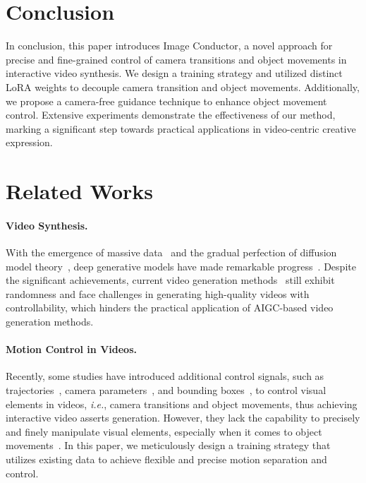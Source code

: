 \documentclass{article} %
\begin{document}
\section{Conclusion}
In conclusion, this paper introduces Image Conductor, a novel approach for precise and fine-grained control of camera transitions and object movements in interactive video synthesis. 
We  design a training strategy and utilized distinct LoRA weights to decouple camera transition and object movements. 
Additionally, we propose a camera-free guidance technique to enhance object movement control. Extensive experiments demonstrate the effectiveness of our method, marking a significant step towards practical applications in video-centric creative expression.

\newpage





\clearpage
\newpage
\appendix

\section{Related Works}
\paragraph{Video Synthesis.} With the emergence of massive data~\citep{bain2021frozen, chen2024panda} and the gradual perfection of diffusion model theory~\citep{ho2020denoising, song2020score, batzolis2021conditional}, deep generative models have made remarkable progress~\citep{ldm, TI, ControlNet, wang2023videocomposer, chen2023videocrafter1, videoworldsimulators2024}. Despite the significant achievements, current video generation methods~\citep{wang2023videocomposer, chen2023videocrafter1, videoworldsimulators2024, blattmann2023stable, girdhar2023emu} still exhibit randomness and face challenges in generating high-quality videos with controllability, which hinders the practical application of AIGC-based video generation methods.

\paragraph{Motion Control in Videos.} 
Recently, some studies have introduced additional control signals, such as trajectories~\citep{yin2023dragnuwa, wu2024draganything, wang2023motionctrl}, camera parameters~\citep{wang2023motionctrl, he2024cameractrl}, and bounding boxes~\citep{wang2024boximator}, to control visual elements in videos, \textit{i.e.}, camera transitions and object movements, thus achieving interactive video asserts generation. However, they lack the capability to precisely and finely manipulate visual elements, especially when it comes to object movements~\citep{yin2023dragnuwa, wang2023motionctrl}. In this paper, we meticulously design a training strategy that utilizes existing data to achieve flexible and precise motion separation and control.
\end{document}
